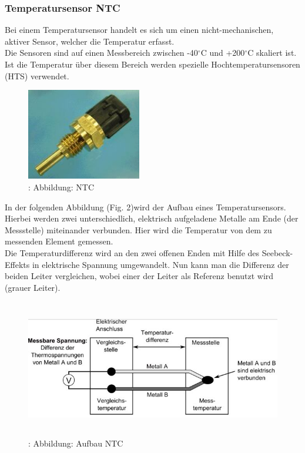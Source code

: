 			\subsubsection{Temperatursensor NTC}
				\begin{flushleft}
					Bei einem Temperatursensor handelt es sich um einen nicht-mechanischen, aktiver	Sensor, welcher die Temperatur erfasst.\\
					Die Sensoren sind auf einen Messbereich zwischen -40$^\circ$C und +200$^\circ$C skaliert ist. Ist die Temperatur über diesem Bereich werden spezielle Hochtemperatursensoren (HTS) verwendet.
				\end{flushleft}

				\begin{figure}
					\centering
					\includegraphics[width=5cm, height=4cm] {ntc.png}
					\caption{\cite{TS04}: Abbildung: NTC}
				\end{figure}
			
				\begin{flushleft}
						In der folgenden Abbildung (Fig. 2)wird der Aufbau eines Temperatursensors. Hierbei werden zwei unterschiedlich, elektrisch aufgeladene Metalle am Ende (der Messstelle) miteinander verbunden. Hier wird die Temperatur von dem zu messenden Element gemessen.\\
						Die Temperaturdifferenz wird an den zwei offenen Enden mit Hilfe des Seebeck-Effekts in elektrische Spannung umgewandelt. Nun kann man die Differenz der beiden Leiter vergleichen, wobei einer der Leiter als Referenz benutzt wird (grauer Leiter).\cite{TS05} 
						
				\end{flushleft}
					
				\begin{figure}
					\centering
					\includegraphics[width=12cm, height=6cm] {aufbau_ntc.png}
					\caption{\cite{TS06}: Abbildung: Aufbau NTC}
				\end{figure}
				
